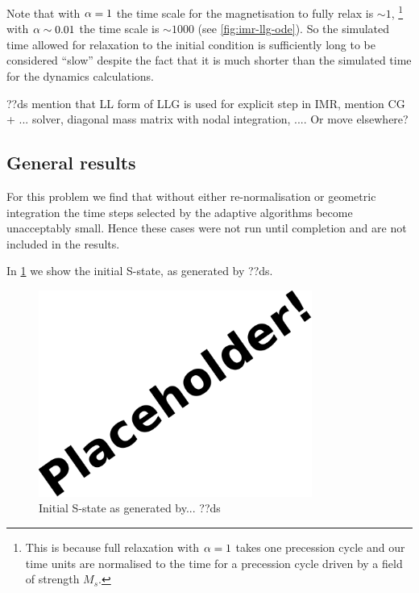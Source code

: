 Note that with $\alpha = 1$ the time scale for the magnetisation to fully relax is $\sim 1$, \footnote{This is because full relaxation with $\alpha = 1$ takes one precession cycle and our time units are normalised to the time for a precession cycle driven by a field of strength $M_s$.} with $\alpha \sim 0.01$ the time scale is $\sim 1000$ (see \eg \cref{fig:imr-llg-ode}).
So the simulated time allowed for relaxation to the initial condition is sufficiently long to be considered ``slow'' despite the fact that it is much shorter than the simulated time for the dynamics calculations.



??ds mention that LL form of LLG is used for explicit step in IMR, mention CG + ... solver, diagonal mass matrix with nodal integration, .... Or move elsewhere?




\subsection{General results}

For this problem we find that without either re-normalisation or geometric integration the time steps selected by the adaptive algorithms become unacceptably small.
Hence these cases were not run until completion and are not included in the results.

In \cref{fig:intial-mumag4} we show the initial S-state, as generated by ??ds.

\begin{figure}
  \centering
  \includegraphics[width=0.8\textwidth]{images/placeholder}
  \caption{Initial S-state as generated by... ??ds}
  \label{fig:intial-mumag4}
\end{figure}

